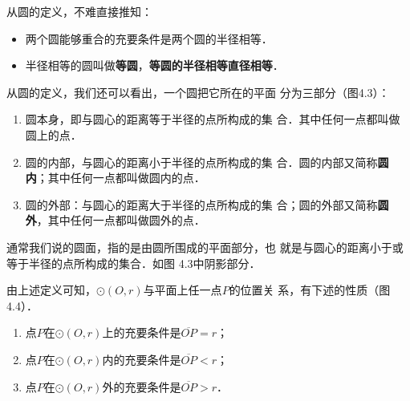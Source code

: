 从圆的定义，不难直接推知：
\begin{itemize}
    \item 两个圆能够重合的充要条件是两个圆的半径相等．
    \item 半径相等的圆叫做\textbf{等圆}，\textbf{等圆的半径相等直径相等}．
\end{itemize}

从圆的定义，我们还可以看出，一个圆把它所在的平面
分为三部分（图4.3）：
\begin{enumerate}
    \item 圆本身，即与圆心的距离等于半径的点所构成的集
合．其中任何一点都叫做圆上的点．
\item 圆的内部，与圆心的距离小于半径的点所构成的集
合．圆的内部又简称\textbf{圆内}；其中任何一点都叫做圆内的点．
\item 圆的外部：与圆心的距离大于半径的点所构成的集
合；圆的外部又简称\textbf{圆外}，其中任何一点都叫做圆外的点．
\end{enumerate}

\begin{figure}[htp]\centering
    \begin{minipage}[t]{0.48\textwidth}
    \centering
{}
    \caption{}
    \end{minipage}
    \begin{minipage}[t]{0.48\textwidth}
    \centering
    \caption{}
    \end{minipage}
    \end{figure}

通常我们说的圆面，指的是由圆所围成的平面部分，也
就是与圆心的距离小于或等于半径的点所构成的集合．如图
4.3中阴影部分．

由上述定义可知，$\odot(O,r)$与平面上任一点$P$的位置关
系，有下述的性质（图4.4）．
\begin{enumerate}
    \item 点$P$在$\odot(O,r)$上的充要条件是$\overline{OP}=r$；
    \item 点$P$在$\odot(O,r)$内的充要条件是$\overline{OP}<r$；
    \item 点$P$在$\odot(O,r)$外的充要条件是$\overline{OP}>r$．
\end{enumerate}

